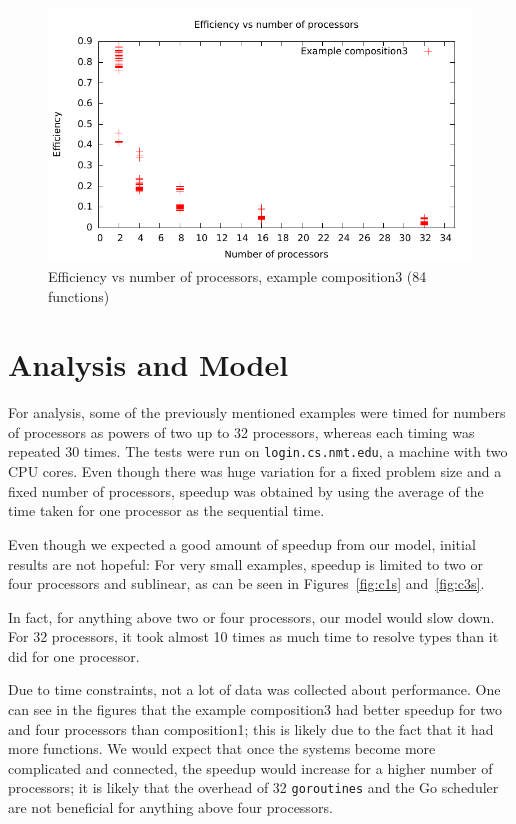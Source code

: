 \documentclass{acm_proc_article-sp}
\begin{document}
\begin{figure}[ht] 
	\centering
	\includegraphics[scale=0.6]{../../data/composition3e.pdf}
	\caption{Efficiency vs number of processors, example composition3 (84
	functions)} 
	\label{fig:c3e} 
\end{figure}
\section{Analysis and Model}

For analysis, some of the previously mentioned examples were timed for numbers
of processors as powers of two up to 32 processors, whereas each timing was
repeated 30 times. The tests were run on \texttt{login.cs.nmt.edu}, a machine
with two CPU cores. Even though there was huge variation for a
fixed problem size and a fixed number of processors, speedup was obtained by
using the average of the time taken for one processor as the sequential time.

Even though we expected a good amount of speedup from our model, initial
results are not hopeful: For very small examples, speedup is limited to two or
four processors and sublinear, as can be seen in Figures~\ref{fig:c1s}
and~\ref{fig:c3s}. 

In fact, for anything above two or four processors, our model would slow down.
For 32 processors, it took almost 10 times as much time to resolve types than
it did for one processor.

Due to time constraints, not a lot of data was collected about performance. One
can see in the figures that the example composition3 had better speedup for two
and four processors than composition1; this is likely due to the fact that it
had more functions. We would expect that once the systems become more
complicated and connected, the speedup would increase for a higher number of
processors; it is likely that the overhead of 32 \texttt{goroutines} and the Go
scheduler are not beneficial for anything above four processors.
\end{document}
